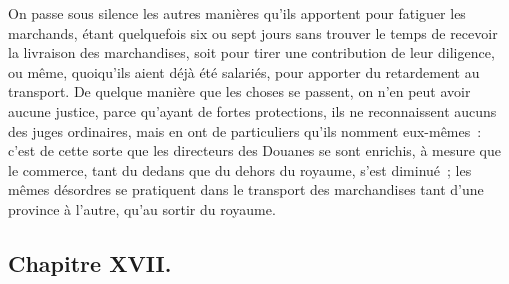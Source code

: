 \documentclass[french,twoside]{book} %
\begin{document}
On passe sous silence les autres manières qu’ils apportent pour fatiguer les marchands, étant quelquefois six ou sept jours sans trouver le temps de recevoir la livraison des marchandises, soit pour tirer une contribution de leur diligence, ou même, quoiqu’ils aient déjà été salariés, pour apporter du retardement au transport. De quelque manière que les choses se passent, on n’en peut avoir aucune justice, parce qu’ayant de fortes protections, ils ne reconnaissent aucuns des juges ordinaires, mais en ont de particuliers qu’ils nomment eux-mêmes : c’est de cette sorte que les directeurs des Douanes se sont enrichis, à mesure que le commerce, tant du dedans que du dehors du royaume, s’est diminué ; les mêmes désordres se pratiquent dans le transport des marchandises tant d’une province à l’autre, qu’au sortir du royaume.
\subsection[{Chapitre XVII.}]{Chapitre XVII.}
\end{document}
